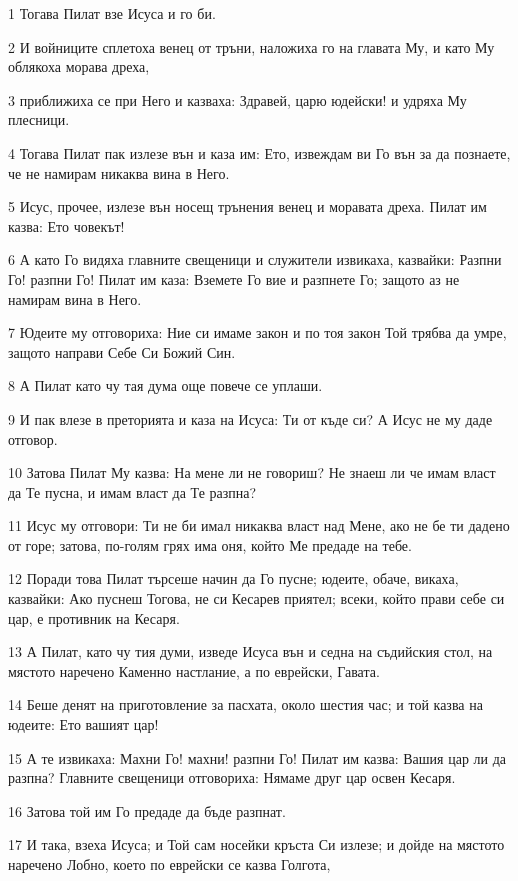 \par 1 Тогава Пилат взе Исуса и го би.
\par 2 И войниците сплетоха венец от тръни, наложиха го на главата Му, и като Му облякоха морава дреха,
\par 3 приближиха се при Него и казваха: Здравей, царю юдейски! и удряха Му плесници.
\par 4 Тогава Пилат пак излезе вън и каза им: Ето, извеждам ви Го вън за да познаете, че не намирам никаква вина в Него.
\par 5 Исус, прочее, излезе вън носещ трънения венец и моравата дреха. Пилат им казва: Ето човекът!
\par 6 А като Го видяха главните свещеници и служители извикаха, казвайки: Разпни Го! разпни Го! Пилат им каза: Вземете Го вие и разпнете Го; защото аз не намирам вина в Него.
\par 7 Юдеите му отговориха: Ние си имаме закон и по тоя закон Той трябва да умре, защото направи Себе Си Божий Син.
\par 8 А Пилат като чу тая дума още повече се уплаши.
\par 9 И пак влезе в преторията и каза на Исуса: Ти от къде си? А Исус не му даде отговор.
\par 10 Затова Пилат Му казва: На мене ли не говориш? Не знаеш ли че имам власт да Те пусна, и имам власт да Те разпна?
\par 11 Исус му отговори: Ти не би имал никаква власт над Мене, ако не бе ти дадено от горе; затова, по-голям грях има оня, който Ме предаде на тебе.
\par 12 Поради това Пилат търсеше начин да Го пусне; юдеите, обаче, викаха, казвайки: Ако пуснеш Тогова, не си Кесарев приятел; всеки, който прави себе си цар, е противник на Кесаря.
\par 13 А Пилат, като чу тия думи, изведе Исуса вън и седна на съдийския стол, на мястото наречено Каменно настлание, а по еврейски, Гавата.
\par 14 Беше денят на приготовление за пасхата, около шестия час; и той казва на юдеите: Ето вашият цар!
\par 15 А те извикаха: Махни Го! махни! разпни Го! Пилат им казва: Вашия цар ли да разпна? Главните свещеници отговориха: Нямаме друг цар освен Кесаря.
\par 16 Затова той им Го предаде да бъде разпнат.
\par 17 И така, взеха Исуса; и Той сам носейки кръста Си излезе; и дойде на мястото наречено Лобно, което по еврейски се казва Голгота,
